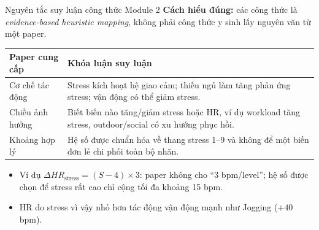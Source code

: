 \documentclass[11pt]{beamer}
\begin{document}
\begin{frame}{Nguyên tắc suy luận công thức Module 2}
\footnotesize
\textbf{Cách hiểu đúng:} các công thức là \textit{evidence-based heuristic mapping}, không phải công thức y sinh lấy nguyên văn từ một paper.

\vspace{0.08cm}
\begin{table}[h]
\centering
\scriptsize
\begin{tabular}{p{3.0cm}p{6.5cm}}
\toprule
\textbf{Paper cung cấp} & \textbf{Khóa luận suy luận} \\
\midrule
Cơ chế tác động & Stress kích hoạt hệ giao cảm; thiếu ngủ làm tăng phản ứng stress; vận động có thể giảm stress. \\
Chiều ảnh hưởng & Biết biến nào tăng/giảm stress hoặc HR, ví dụ workload tăng stress, outdoor/social có xu hướng phục hồi. \\
Khoảng hợp lý & Hệ số được chuẩn hóa về thang stress 1--9 và không để một biến đơn lẻ chi phối toàn bộ nhãn. \\
\bottomrule
\end{tabular}
\end{table}

\vspace{0.04cm}
\begin{itemize}
    \item Ví dụ $\Delta HR_{\text{stress}}=(S-4)\times3$: paper không cho ``3 bpm/level''; hệ số được chọn để stress rất cao chỉ cộng tối đa khoảng 15 bpm.
    \item HR do stress vì vậy nhỏ hơn tác động vận động mạnh như Jogging ($+40$ bpm).
\end{itemize}

\vspace{0.04cm}
\end{frame}
\end{document}

